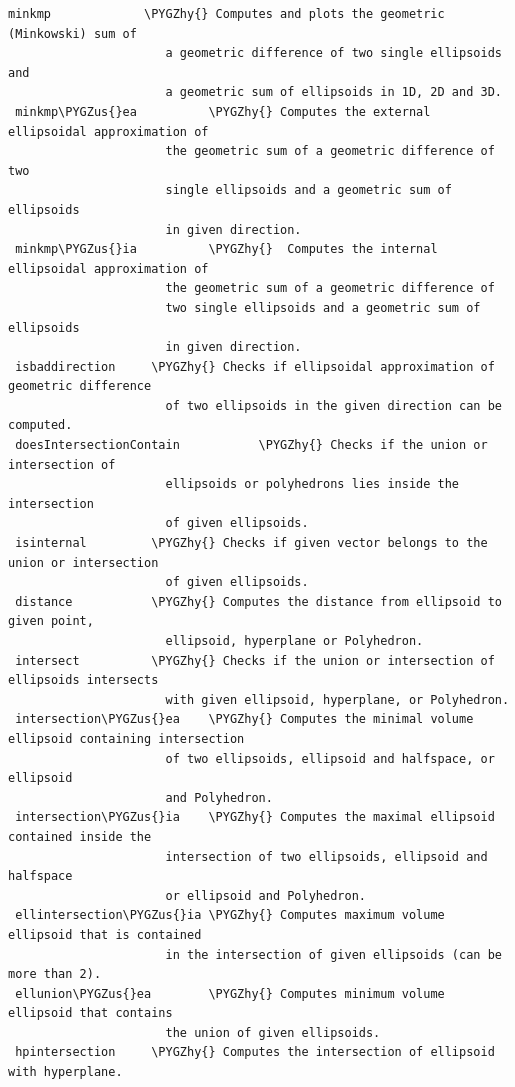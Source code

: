 \documentclass[letterpaper,10pt,english]{sphinxmanual}
\def\PYGZus{\char`\_}
\def\PYGZhy{\char`\-}
\begin{document}
\begin{Verbatim}[commandchars=\\\{\}]
 minkmp             \PYGZhy{} Computes and plots the geometric (Minkowski) sum of
                      a geometric difference of two single ellipsoids and
                      a geometric sum of ellipsoids in 1D, 2D and 3D.
 minkmp\PYGZus{}ea          \PYGZhy{} Computes the external ellipsoidal approximation of
                      the geometric sum of a geometric difference of two
                      single ellipsoids and a geometric sum of ellipsoids
                      in given direction.
 minkmp\PYGZus{}ia          \PYGZhy{}  Computes the internal ellipsoidal approximation of
                      the geometric sum of a geometric difference of
                      two single ellipsoids and a geometric sum of ellipsoids
                      in given direction.
 isbaddirection     \PYGZhy{} Checks if ellipsoidal approximation of geometric difference
                      of two ellipsoids in the given direction can be computed.
 doesIntersectionContain           \PYGZhy{} Checks if the union or intersection of
                      ellipsoids or polyhedrons lies inside the intersection
                      of given ellipsoids.
 isinternal         \PYGZhy{} Checks if given vector belongs to the union or intersection
                      of given ellipsoids.
 distance           \PYGZhy{} Computes the distance from ellipsoid to given point,
                      ellipsoid, hyperplane or Polyhedron.
 intersect          \PYGZhy{} Checks if the union or intersection of ellipsoids intersects
                      with given ellipsoid, hyperplane, or Polyhedron.
 intersection\PYGZus{}ea    \PYGZhy{} Computes the minimal volume ellipsoid containing intersection
                      of two ellipsoids, ellipsoid and halfspace, or ellipsoid
                      and Polyhedron.
 intersection\PYGZus{}ia    \PYGZhy{} Computes the maximal ellipsoid contained inside the
                      intersection of two ellipsoids, ellipsoid and halfspace
                      or ellipsoid and Polyhedron.
 ellintersection\PYGZus{}ia \PYGZhy{} Computes maximum volume ellipsoid that is contained
                      in the intersection of given ellipsoids (can be more than 2).
 ellunion\PYGZus{}ea        \PYGZhy{} Computes minimum volume ellipsoid that contains
                      the union of given ellipsoids.
 hpintersection     \PYGZhy{} Computes the intersection of ellipsoid with hyperplane.
\end{Verbatim}
\end{document}
